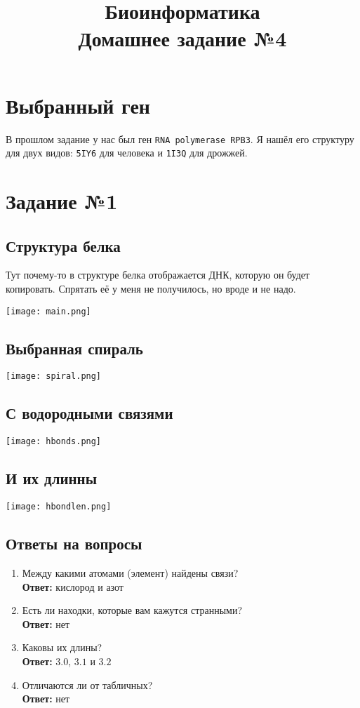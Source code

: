 \documentclass{article}
\title{Биоинформатика \\ Домашнее задание №4}
\begin{document}
  \maketitle

  \section{Выбранный ген}
  В прошлом задание у нас был ген \texttt{RNA polymerase RPB3}.
  Я нашёл его структуру для двух видов: \texttt{5IY6} для человека и \texttt{1I3Q} для дрожжей.

  \section{Задание №1}
  \subsection{Структура белка}
  Тут почему-то в структуре белка отображается ДНК, которую он будет копировать.
  Спрятать её у меня не получилось, но вроде и не надо.
  \begin{center}
    \texttt{[image: main.png]}
  \end{center}

  \subsection{Выбранная спираль}
  \texttt{[image: spiral.png]}

  \subsection{С водородными связями}
  \texttt{[image: hbonds.png]}

  \subsection{И их длинны}
  \texttt{[image: hbondlen.png]}

  \subsection{Ответы на вопросы}
  \begin{enumerate}
    \item Между какими атомами (элемент) найдены связи? \\
      \textbf{Ответ:} кислород и азот
    \item Есть ли находки, которые вам кажутся странными? \\
      \textbf{Ответ:} нет
    \item Каковы их длины? \\
      \textbf{Ответ:} $3.0$, $3.1$ и $3.2$
    \item Отличаются ли от табличных? \\
      \textbf{Ответ:} нет
  \end{enumerate}
\end{document}

